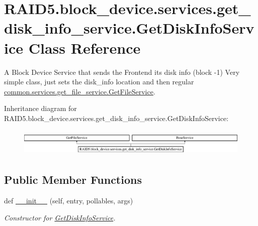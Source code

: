 \hypertarget{class_r_a_i_d5_1_1block__device_1_1services_1_1get__disk__info__service_1_1_get_disk_info_service}{}\section{R\+A\+I\+D5.\+block\+\_\+device.\+services.\+get\+\_\+disk\+\_\+info\+\_\+service.\+Get\+Disk\+Info\+Service Class Reference}
\label{class_r_a_i_d5_1_1block__device_1_1services_1_1get__disk__info__service_1_1_get_disk_info_service}


A Block Device Service that sends the Frontend it\textquotesingle{}s disk info (block -\/1) Very simple class, just sets the disk\+\_\+info location and then regular \hyperlink{class_r_a_i_d5_1_1common_1_1services_1_1get__file__service_1_1_get_file_service}{common.\+services.\+get\+\_\+file\+\_\+service.\+Get\+File\+Service}.  


Inheritance diagram for R\+A\+I\+D5.\+block\+\_\+device.\+services.\+get\+\_\+disk\+\_\+info\+\_\+service.\+Get\+Disk\+Info\+Service\+:\begin{figure}[H]
\begin{center}
\leavevmode
\includegraphics[height=1.314554cm]{class_r_a_i_d5_1_1block__device_1_1services_1_1get__disk__info__service_1_1_get_disk_info_service}
\end{center}
\end{figure}
\subsection*{Public Member Functions}
\begin{DoxyCompactItemize}
\item 
def \hyperlink{class_r_a_i_d5_1_1block__device_1_1services_1_1get__disk__info__service_1_1_get_disk_info_service_a24750dbde71ba0f0c2048e38e64258fa}{\+\_\+\+\_\+init\+\_\+\+\_\+} (self, entry, pollables, args)
\begin{DoxyCompactList}\small\item\em Constructor for \hyperlink{class_r_a_i_d5_1_1block__device_1_1services_1_1get__disk__info__service_1_1_get_disk_info_service}{Get\+Disk\+Info\+Service}. \end{DoxyCompactList}\end{DoxyCompactItemize}

